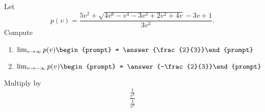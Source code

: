 \documentclass{ximera}
\author{Bart Snapp}
\begin{document}
\begin{exercise}
Let 
\[
p(v) = \frac{5 v^2+\sqrt{4 v^6-v^4-3 v^3+2 v^2+4 v}-3 v+1}{3 v^3}.
\]
Compute
\begin{enumerate}
\item $\lim_{v\to \infty} p(v) \begin{prompt} = \answer{\frac{2}{3}}\end{prompt}$
\item $\lim_{v\to -\infty}p(v) \begin{prompt} = \answer{-\frac{2}{3}}\end{prompt}$
\end{enumerate}
\begin{hint}
Multiply by
\[
\frac{\frac{1}{v^3}}{\frac{1}{v^3}}
\]
\end{hint}
\end{exercise}
\end{document}
